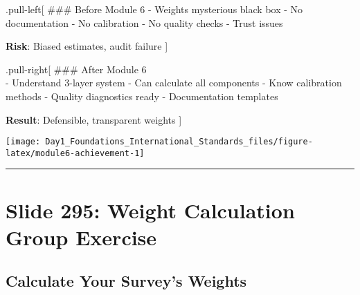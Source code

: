 \documentclass[
]{article}
\begin{document}
.pull-left{[} \#\#\# Before Module 6 - Weights mysterious black box - No
documentation - No calibration - No quality checks - Trust issues

\textbf{Risk}: Biased estimates, audit failure {]}

.pull-right{[} \#\#\# After Module 6\\
- Understand 3-layer system - Can calculate all components - Know
calibration methods - Quality diagnostics ready - Documentation
templates

\textbf{Result}: Defensible, transparent weights {]}

\texttt{[image: Day1\_Foundations\_International\_Standards\_files/figure-latex/module6-achievement-1]}

\begin{center}\rule{0.5\linewidth}{0.5pt}\end{center}

\section{Slide 295: Weight Calculation Group
Exercise}\label{slide-295-weight-calculation-group-exercise}

\subsection{Calculate Your Survey's
Weights}\label{calculate-your-surveys-weights}
\end{document}
